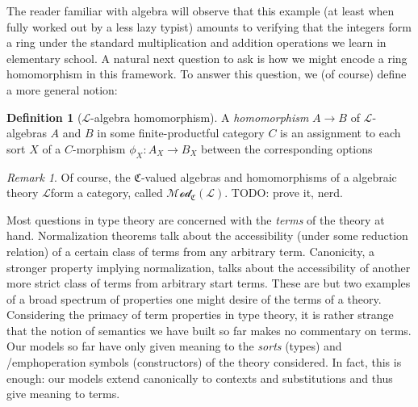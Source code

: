 \documentclass[12pt,twoside]{reedthesis}
\theoremstyle{definition}
\newtheorem{definition}{Definition}
\theoremstyle{remark}
\newtheorem{remark}{Remark}
\theoremstyle{theorem}
\begin{document}
The reader familiar with algebra will observe that this example (at least when
fully worked out by a less lazy typist) amounts to verifying that the integers
form a ring under the standard multiplication and addition operations we learn
in elementary school. A natural next question to ask is how we might encode a
ring homomorphism in this framework. To answer this question, we (of course)
define a more general notion:

\begin{definition}[$\mathcal{L}$-algebra homomorphism]\label{def:homomorphism}
  A \emph{homomorphism} \( A \rightarrow B\) of $\mathcal{L}$-algebras $A$ and $B$ in some
  finite-productful category $C$ is an assignment to each sort $X$ of a
  $C$-morphism \( \phi_{X} : A_{X} \rightarrow B_{X}\) between the corresponding options
\end{definition}

\begin{remark}
  Of course, the $\mathfrak{C}$-valued algebras and homomorphisms of a algebraic
  theory $\mathcal{L} $form a category, called
  $\mathscr{Mod}_{\mathfrak{C}}(\mathcal{L})$. TODO: prove it, nerd.
\end{remark}

Most questions in type theory are concerned with the \emph{terms} of the theory
at hand. Normalization theorems talk about the accessibility (under some
reduction relation) of a certain class of terms from any arbitrary term.
Canonicity, a stronger property implying normalization, talks about the
accessibility of another more strict class of terms from arbitrary start terms.
These are but two examples of a broad spectrum of properties one might desire of
the terms of a theory. Considering the primacy of term properties in type
theory, it is rather strange that the notion of semantics we have built so far
makes no commentary on terms. Our models so far have only given meaning to the
\emph{sorts} (types) and /emph{operation symbols} (constructors) of the theory
considered. In fact, this is enough: our models extend canonically to contexts
and substitutions and thus give meaning to terms.

\DeclarePairedDelimiter{\sem}{\llbracket}{\rrbracket}
\end{document}
